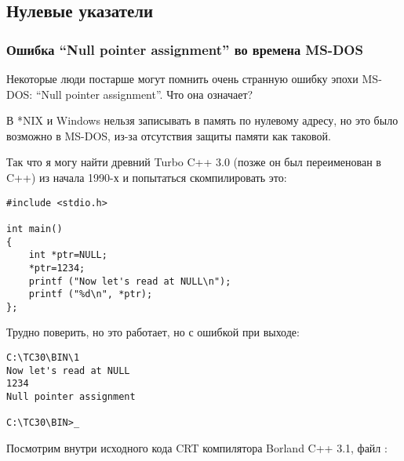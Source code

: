\subsection{Нулевые указатели}

\subsubsection{Ошибка ``Null pointer assignment'' во времена MS-DOS}

Некоторые люди постарше могут помнить очень странную ошибку эпохи MS-DOS: ``Null pointer assignment''.
Что она означает?

В *NIX и Windows нельзя записывать в память по нулевому адресу, но это было возможно в MS-DOS, из-за отсутствия
защиты памяти как таковой.

Так что я могу найти древний Turbo C++ 3.0 (позже он был переименован в C++) из начала 1990-х и попытаться
скомпилировать это:

\begin{lstlisting}[style=customc]
#include <stdio.h>

int main()
{
	int *ptr=NULL;
	*ptr=1234;
	printf ("Now let's read at NULL\n");
	printf ("%d\n", *ptr);
};
\end{lstlisting}

Трудно поверить, но это работает, но с ошибкой при выходе:

\begin{lstlisting}[caption=Древний Turbo C++ 3.0]
C:\TC30\BIN\1
Now let's read at NULL
1234
Null pointer assignment

C:\TC30\BIN>_
\end{lstlisting}

Посмотрим внутри исходного кода \ac{CRT} компилятора Borland C++ 3.1, файл :

